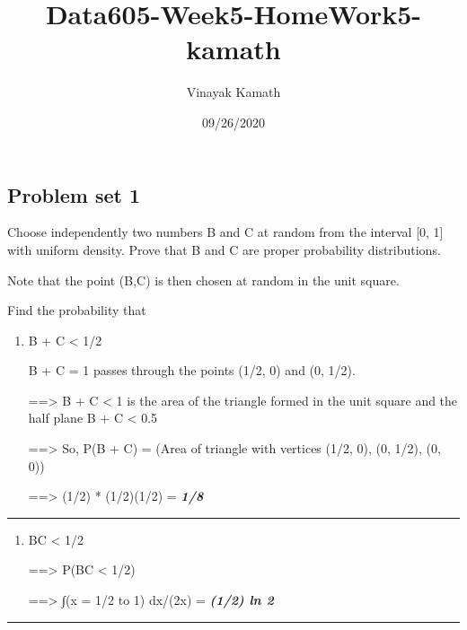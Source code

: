 \documentclass[
]{article}
\title{Data605-Week5-HomeWork5-kamath}
\author{Vinayak Kamath}
\date{09/26/2020}
\begin{document}
\maketitle

\hypertarget{problem-set-1}{%
\subsection{Problem set 1}\label{problem-set-1}}

Choose independently two numbers B and C at random from the interval
{[}0, 1{]} with uniform density. Prove that B and C are proper
probability distributions.

Note that the point (B,C) is then chosen at random in the unit square.

Find the probability that

\begin{enumerate}
\def\labelenumi{(\alph{enumi})}
\item
  B + C \textless{} 1/2

  B + C = 1 passes through the points (1/2, 0) and (0, 1/2).

  ==\textgreater{} B + C \textless{} 1 is the area of the triangle
  formed in the unit square and the half plane B + C \textless{} 0.5

  ==\textgreater{} So, P(B + C) = (Area of triangle with vertices (1/2,
  0), (0, 1/2), (0, 0))

  ==\textgreater{} (1/2) * (1/2)(1/2) = \textbf{\emph{1/8}}
\end{enumerate}

\begin{center}\rule{0.5\linewidth}{0.5pt}\end{center}

\begin{enumerate}
\def\labelenumi{(\alph{enumi})}
\setcounter{enumi}{1}
\item
  BC \textless{} 1/2

  ==\textgreater{} P(BC \textless{} 1/2)

  ==\textgreater{} ∫(x = 1/2 to 1) dx/(2x) = \textbf{\emph{(1/2) ln 2}}
\end{enumerate}

\begin{center}\rule{0.5\linewidth}{0.5pt}\end{center}
\end{document}
